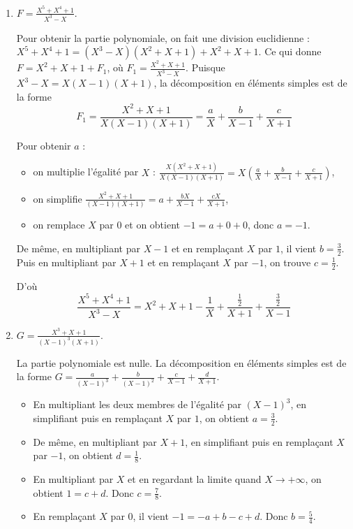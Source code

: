 \documentclass[11pt,a4paper]{article}
\begin{document}
\begin{enumerate}

\item $F=\frac{X^5+X^4+1}{X^3-X}$.

Pour obtenir la partie polynomiale, on fait une division euclidienne : 
$X^5+X^4+1=(X^3-X)(X^2+X+1)+ X^2+X+1$. Ce qui donne $F=X^2+X+1+F_1$, 
où $F_1=\frac{X^2+X+1}{X^3-X}$. Puisque $X^3-X=X(X-1)(X+1)$, 
la décomposition en éléments simples est de la forme 
$$F_1 = \frac{X^2+X+1}{X(X-1)(X+1)}=\frac{a}{X}+\frac{b}{X-1}+\frac{c}{X+1}$$

Pour obtenir $a$ :
\begin{itemize}
  \item on multiplie l'égalité par $X$ : $\frac{X(X^2+X+1)}{X(X-1)(X+1)}=X \left(\frac{a}{X}+\frac{b}{X-1}+\frac{c}{X+1}\right)$,
  \item on simplifie $\frac{X^2+X+1}{(X-1)(X+1)}= a+\frac{bX}{X-1}+\frac{cX}{X+1}$,
  \item on remplace $X$ par $0$ et on obtient $-1= a+0+0$, donc $a=-1$.
\end{itemize}

 De même, en multipliant par $X-1$ et en remplaçant $X$ par $1$, il vient $b=\frac{3}{2}$.
 Puis en multipliant par $X+1$ et en remplaçant $X$ par $-1$, on trouve $c=\frac{1}{2}$.

D'où
$$\frac{X^5+X^4+1}{X^3-X} = X^2+X+1-\frac{1}{X}+\frac{\tfrac12}{X+1}+\frac{\tfrac32}{X-1}$$

\item $G=\frac{X^3+X+1}{(X-1)^3(X+1)}$. 

La partie polynomiale est nulle. La décomposition en éléments simples est de la forme
$G=\frac{a}{(X-1)^3}+\frac{b}{(X-1)^2}+\frac{c}{X-1}+\frac{d}{X+1}$.

\begin{itemize}
  \item En multipliant les deux membres de l'égalité par $(X-1)^3$, 
en simplifiant puis en remplaçant $X$ par $1$, 
on obtient $a=\frac32$. 

  \item De même, en multipliant par $X+1$, 
en simplifiant puis en remplaçant $X$ par $-1$, 
on obtient $d=\frac18$.

  \item En multipliant par $X$ et en regardant la limite 
  quand $X\to +\infty$, on obtient $1=c+d$. Donc $c=\frac78$.

  \item En remplaçant $X$ par $0$, il vient $-1=-a+b-c+d$.
  Donc $b = \frac54$.
\end{itemize}


\end{enumerate}
\end{document}
